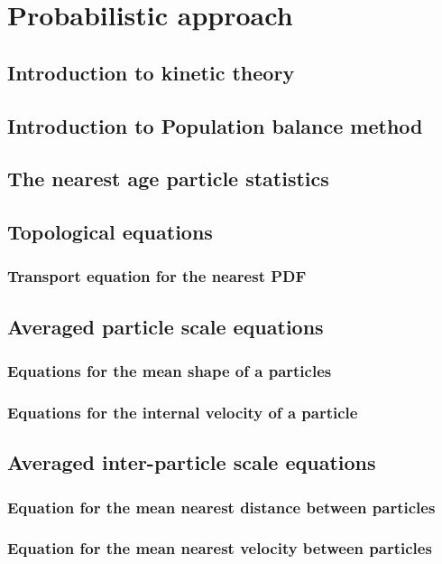 \documentclass[12pt,a4paper,openany]{My_book}
\newcommand{\tb}[1]{\color{blue}#1\color{black}}
\begin{document}


\tb{
\chapter{Probabilistic approach}
\section{Introduction to kinetic theory}
\section{Introduction to Population balance method}

\section{The nearest age particle statistics}
\section{Topological equations}
\subsection{Transport equation for the nearest PDF}

\section{Averaged particle scale equations}
\subsection{Equations for the mean shape of a particles}
\subsection{Equations for the internal velocity of a particle}


\section{Averaged inter-particle scale equations}
\subsection{Equation for the mean nearest distance between particles }
\subsection{Equation for the mean nearest velocity between particles }


}
\end{document}
